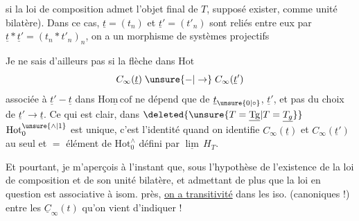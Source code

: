 si la loi de composition admet l'objet final de $T$, supposé exister, comme unité bilatère). Dans ce cas, $\underline t=(t_n)$ et $\underline t'=(t'_n)$ sont reliés entre eux par $\underline t*\underline t'=(t_n*t'_n)_n$,  on a un morphisme de systèmes projectifs

Je ne sais d'ailleurs pas si la flèche dans $\mathrm{Hot}$
\[
C_\infty(\underline t)\mathrel{\unsure{-|\to}}C_\infty(\underline t')
\]
associée à $\underline t'\mathrel{-}\underline t$ dans $\underline{\mathrm{Hom\,cof}}$  ne dépend que de $\underline t_{\unsure{0|\circ}}$, $\underline t'$, et pas du choix de $\underline t'\longrightarrow\underline t$. Ce qui est clair,   dans $\deleted{\unsure{T=\underline{\mathrm{Tg}}|T=\underline{T_g}}}$ $\mathrm{Hot}_0^{\unsure{\wedge|1}}$ est unique, c'est l'identité quand on identifie $C_\infty(\underline t)$ et $C_\infty(\underline t')$ au seul et $=$ élément de $\mathrm{Hot}_0^\wedge$ défini par $\underline{\lim}\,H_T$. 

Et pourtant, je m'aperçois à l'instant que, sous l'hypothèse de l'existence de la loi de composition et de son unité bilatère, et admettant de plus que la loi en question est associative à isom. près, \uline{on a transitivité} dans les iso. (canoniques !) entre les $\underline C_\infty(t)$ qu'on vient d'indiquer !
